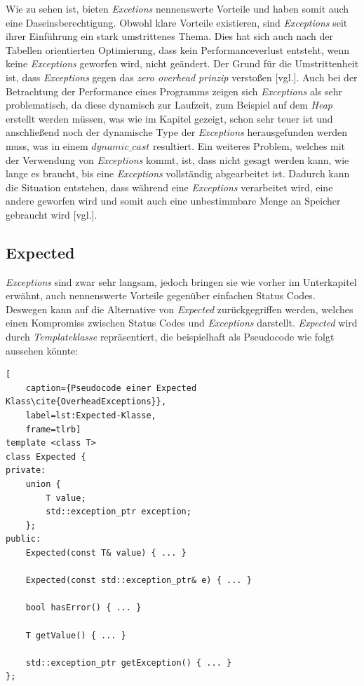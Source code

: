 Wie zu sehen ist, bieten \emph{Excetions} nennenswerte Vorteile und haben somit auch eine
Daseinsberechtigung.
\newline
\newline
Obwohl klare Vorteile existieren, sind \emph{Exceptions} seit ihrer Einführung ein stark
umstrittenes Thema. Dies hat sich auch nach der Tabellen orientierten Optimierung, dass kein
Performanceverlust entsteht, wenn keine \emph{Exceptions} geworfen wird, nicht geändert. Der
Grund für die Umstrittenheit ist, dass \emph{Exceptions} gegen das \emph{zero overhead prinzip}
verstoßen \cite{Exception1998}[vgl.]. Auch bei der Betrachtung der Performance eines Programms
zeigen sich \emph{Exceptions} als sehr problematisch, da diese dynamisch zur Laufzeit, zum
Beispiel auf dem \emph{Heap}
erstellt werden müssen, was wie im Kapitel \emph{} gezeigt, schon sehr
teuer ist und
anschließend noch der dynamische Type der \emph{Exceptions} herausgefunden werden muss, was in
einem \emph{$dynamic\_cast$} resultiert. Ein weiteres Problem, welches mit der Verwendung von
\emph{Exceptions} kommt, ist, dass nicht gesagt werden kann, wie lange es braucht, bis eine
\emph{Exceptions} vollständig abgearbeitet ist. Dadurch kann die Situation entstehen, dass
während eine \emph{Exceptions} verarbeitet wird, eine andere geworfen wird und somit auch eine
unbestimmbare Menge an Speicher gebraucht wird \cite{HandsOn}[vgl.].

\subsection{Expected}
\emph{Exceptions} sind zwar sehr langsam, jedoch bringen sie wie vorher im Unterkapitel
\emph{} erwähnt, auch nennenswerte Vorteile gegenüber einfachen Status
Codes. Deswegen
kann auf die Alternative von \emph{Expected} zurückgegriffen werden, welches einen Kompromiss
zwischen Status Codes und \emph{Exceptions} darstellt. \emph{Expected} wird durch
\emph{Templateklasse} repräsentiert, die beispielhaft als Pseudocode wie folgt aussehen könnte:

\begin{lstlisting}[
    caption={Pseudocode einer Expected Klass\cite{OverheadExceptions}},
    label=lst:Expected-Klasse,
    frame=tlrb]
template <class T>
class Expected {
private:
    union {
        T value;
        std::exception_ptr exception;
    };
public:
    Expected(const T& value) { ... }
    
    Expected(const std::exception_ptr& e) { ... }
    
    bool hasError() { ... }
    
    T getValue() { ... }
    
    std::exception_ptr getException() { ... }
};
\end{lstlisting}

